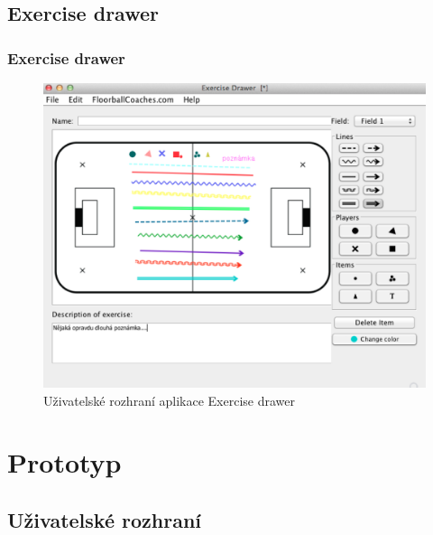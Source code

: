 \documentclass{beamer}
\begin{document}
\subsection{Exercise drawer}
\begin{frame}
\frametitle{Exercise drawer}
  \begin{figure}[H]
    \includegraphics[height=.6\textheight]{img/exercise_drawer}
    \caption{Uživatelské rozhraní aplikace Exercise drawer}
    \label{pic:exercisedrawer}
  \end{figure}
\end{frame}

\section{Prototyp}

\subsection{Uživatelské rozhraní}
\end{document}
